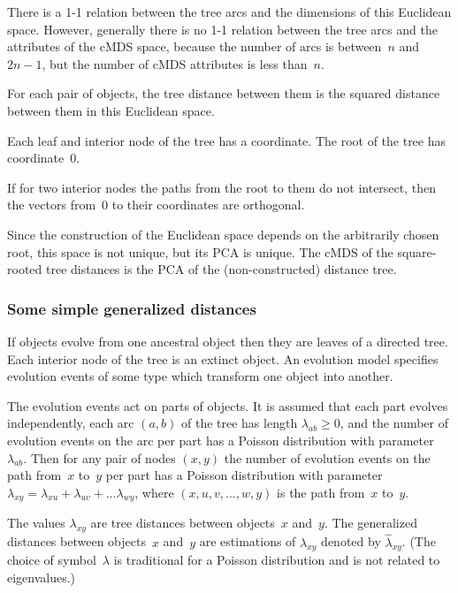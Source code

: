 \documentclass[10pt,a4paper]{article}
\begin{document}
There is a 1-1 relation between the tree arcs and the dimensions of this Euclidean space.
However, generally there is no 1-1 relation between the tree arcs and the attributes of the cMDS space,
because the number of arcs is between~$n$ and $2n-1$, but the number of cMDS attributes is less than~$n$.

For each pair of objects, the tree distance between them is the squared distance between them in this Euclidean space.

Each leaf and interior node of the tree has a coordinate.
The root of the tree has coordinate~0.

If for two interior nodes the paths from the root to them do not intersect, then the vectors from~0 to their coordinates are orthogonal.

Since the construction of the Euclidean space depends on the arbitrarily chosen root, this space is not unique,
but its PCA is unique.
The cMDS of the square-rooted tree distances is the PCA of the (non-constructed) distance tree.



\subsubsection {Some simple generalized distances}


If objects evolve from one ancestral object then they are leaves of a directed tree.
Each interior node of the tree is an extinct object.
An evolution model specifies evolution events of some type which transform one object into another.

The evolution events act on parts of objects.
It is assumed that each part evolves independently, each arc $(a,b)$ of the tree has length $\lambda_{ab} \ge 0$,
and the number of evolution events on the arc per part has a Poisson distribution with parameter $\lambda_{ab}$.
Then for any pair of nodes $(x,y)$ the number of evolution events on the path from~$x$ to~$y$ per part has a Poisson distribution with parameter
$\lambda_{xy} = \lambda_{xu} + \lambda_{uv} + \dots \lambda_{wy}$,
where $(x, u, v, \dots, w, y)$ is the path from~$x$ to~$y$.

The values $\lambda_{xy}$ are tree distances between objects~$x$ and~$y$.
The generalized distances between objects~$x$ and~$y$ are estimations of $\lambda_{xy}$
denoted by $\hat \lambda_{xy}$.
(The choice of symbol~$\lambda$ is traditional for a Poisson distribution and is not related to eigenvalues.)
\end{document}
